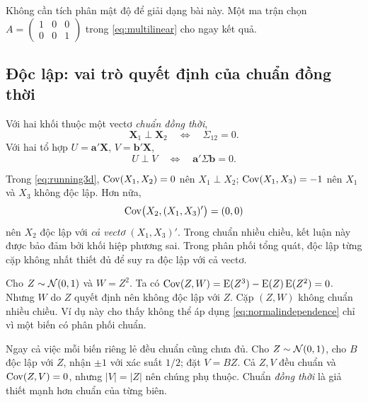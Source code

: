 Không cần tích phân mật độ để giải dạng bài này. Một ma trận chọn
$A=\begin{pmatrix}1&0&0\\0&0&1\end{pmatrix}$ trong
\eqref{eq:multilinear} cho ngay kết quả.

\subsection{Độc lập: vai trò quyết định của chuẩn đồng thời}
\begin{result}
Với hai khối thuộc một vectơ \emph{chuẩn đồng thời},
\begin{equation}
 \mathbf X_1\perp\mathbf X_2
 \quad\Longleftrightarrow\quad \Sigma_{12}=0.
 \label{eq:normalindependence}
\end{equation}
Với hai tổ hợp $U=\mathbf a'\mathbf X$, $V=\mathbf b'\mathbf X$,
\begin{equation}
 U\perp V\quad\Longleftrightarrow\quad
 \mathbf a'\Sigma\mathbf b=0.
 \label{eq:linearindependence}
\end{equation}
\end{result}


Trong \eqref{eq:running3d}, $\operatorname{Cov}(X_1,X_2)=0$ nên $X_1\perp X_2$;
$\operatorname{Cov}(X_1,X_3)=-1$ nên $X_1$ và $X_3$ không độc lập. Hơn nữa,
\[
 \operatorname{Cov}\bigl(X_2,(X_1,X_3)'\bigr)=(0,0)
\]
nên $X_2$ độc lập với \emph{cả vectơ} $(X_1,X_3)'$.
Trong chuẩn nhiều chiều, kết luận này được bảo đảm bởi khối hiệp phương sai.
Trong phân phối tổng quát, độc lập từng cặp không nhất thiết đủ để suy ra
độc lập với cả vectơ.

\begin{example}
Cho $Z\sim\mathcal N(0,1)$ và $W=Z^2$. Ta có
$\operatorname{Cov}(Z,W)=\operatorname{E}(Z^3)-\operatorname{E}(Z)\operatorname{E}(Z^2)=0$.
Nhưng $W$ do $Z$ quyết định nên không độc lập với $Z$.
Cặp $(Z,W)$ không chuẩn nhiều chiều.
Ví dụ này cho thấy không thể áp dụng \eqref{eq:normalindependence}
chỉ vì một biến có phân phối chuẩn.
\end{example}

Ngay cả việc mỗi biến riêng lẻ đều chuẩn cũng chưa đủ. Cho $Z\sim\mathcal N(0,1)$,
cho $B$ độc lập với $Z$, nhận $\pm1$ với xác suất $1/2$; đặt $V=BZ$.
Cả $Z,V$ đều chuẩn và $\operatorname{Cov}(Z,V)=0$, nhưng $|V|=|Z|$ nên chúng phụ thuộc.
Chuẩn \emph{đồng thời} là giả thiết mạnh hơn chuẩn của từng biên.

